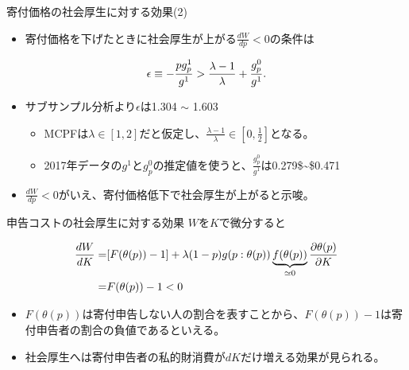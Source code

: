 \documentclass[
  ignorenonframetext,
  aspectratio=169,
]{beamer}
\providecommand{\tightlist}{%
  \setlength{\itemsep}{0pt}\setlength{\parskip}{0pt}}
\begin{document}
\begin{frame}{寄付価格の社会厚生に対する効果(2)}
\protect\hypertarget{ux5bc4ux4ed8ux4fa1ux683cux306eux793eux4f1aux539aux751fux306bux5bfeux3059ux308bux52b9ux679c2}{}
\begin{itemize}
\tightlist
\item
  寄付価格を下げたときに社会厚生が上がる\(\frac{dW}{dp}<0\)の条件は
\end{itemize}

\begin{align}
  \epsilon\equiv -\frac{pg_p^1}{g^1}>\frac{\lambda-1}{\lambda}+\frac{g_p^0}{g^1}\notag.
\end{align}

\begin{itemize}
\tightlist
\item
  サブサンプル分析より\(\epsilon\)は1.304 \(\sim\) 1.603

  \begin{itemize}
  \tightlist
  \item
    MCPFは\(\lambda\in[1,2]\)だと仮定し、\(\frac{\lambda-1}{\lambda}\in[0,\frac12]\)となる。
  \item
    2017年データの\(g^1\)と\(g_p^0\)の推定値を使うと、\(\frac{g_p^0}{g^1}\)は0.279\$\sim\$0.471
  \end{itemize}
\item
  \(\frac{dW}{dp}<0\)がいえ、寄付価格低下で社会厚生が上がると示唆。
\end{itemize}
\end{frame}

\begin{frame}{申告コストの社会厚生に対する効果}
\protect\hypertarget{ux7533ux544aux30b3ux30b9ux30c8ux306eux793eux4f1aux539aux751fux306bux5bfeux3059ux308bux52b9ux679c}{}
\(W\)を\(K\)で微分すると

\begin{align}
  \frac{dW}{dK}=&[F(\theta(p))-1]+\lambda(1-p)g(p:\theta(p))\underbrace{f(\theta(p))}_{\simeq0}\frac{\partial \theta(p)}{\partial K}\notag\\
  =&F(\theta(p))-1<0\notag
\end{align}

\begin{itemize}
\tightlist
\item
  \(F(\theta(p))\)は寄付申告しない人の割合を表すことから、\(F(\theta(p))-1\)は寄付申告者の割合の負値であるといえる。
\item
  社会厚生へは寄付申告者の私的財消費が\(dK\)だけ増える効果が見られる。
\end{itemize}
\end{frame}
\end{document}
